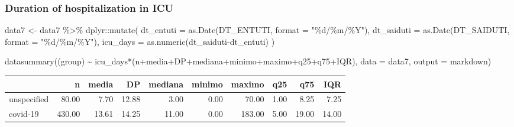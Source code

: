 \documentclass[
]{article}
\newenvironment{Shaded}{\begin{snugshade}}{\end{snugshade}}
\newcommand{\AttributeTok}[1]{\textcolor[rgb]{0.77,0.63,0.00}{#1}}
\newcommand{\FunctionTok}[1]{\textcolor[rgb]{0.00,0.00,0.00}{#1}}
\newcommand{\NormalTok}[1]{#1}
\newcommand{\OtherTok}[1]{\textcolor[rgb]{0.56,0.35,0.01}{#1}}
\newcommand{\SpecialCharTok}[1]{\textcolor[rgb]{0.00,0.00,0.00}{#1}}
\newcommand{\StringTok}[1]{\textcolor[rgb]{0.31,0.60,0.02}{#1}}
\begin{document}
\hypertarget{duration-of-hospitalization-in-icu}{%
\subsubsection{Duration of hospitalization in
ICU}\label{duration-of-hospitalization-in-icu}}

\begin{Shaded}
\begin{Highlighting}[]
\NormalTok{data7 }\OtherTok{\textless{}{-}}\NormalTok{ data7 }\SpecialCharTok{\%\textgreater{}\%}
\NormalTok{   dplyr}\SpecialCharTok{::}\FunctionTok{mutate}\NormalTok{(}
    \AttributeTok{dt\_entuti =} \FunctionTok{as.Date}\NormalTok{(DT\_ENTUTI, }\AttributeTok{format =} \StringTok{"\%d/\%m/\%Y"}\NormalTok{),}
    \AttributeTok{dt\_saiduti =} \FunctionTok{as.Date}\NormalTok{(DT\_SAIDUTI, }\AttributeTok{format =} \StringTok{"\%d/\%m/\%Y"}\NormalTok{),}
    \AttributeTok{icu\_days =} \FunctionTok{as.numeric}\NormalTok{(dt\_saiduti}\SpecialCharTok{{-}}\NormalTok{dt\_entuti)}
\NormalTok{)}
\end{Highlighting}
\end{Shaded}

\begin{Shaded}
\begin{Highlighting}[]
\FunctionTok{datasummary}\NormalTok{((group) }\SpecialCharTok{\textasciitilde{}}\NormalTok{ icu\_days}\SpecialCharTok{*}\NormalTok{(n}\SpecialCharTok{+}\NormalTok{media}\SpecialCharTok{+}\NormalTok{DP}\SpecialCharTok{+}\NormalTok{mediana}\SpecialCharTok{+}\NormalTok{minimo}\SpecialCharTok{+}\NormalTok{maximo}\SpecialCharTok{+}\NormalTok{q25}\SpecialCharTok{+}\NormalTok{q75}\SpecialCharTok{+}\NormalTok{IQR),}
            \AttributeTok{data =}\NormalTok{ data7, }\AttributeTok{output =} \StringTok{\textquotesingle{}markdown\textquotesingle{}}\NormalTok{)}
\end{Highlighting}
\end{Shaded}

\begin{longtable}[]{@{}lrrrrrrrrr@{}}
\toprule
& n & media & DP & mediana & minimo & maximo & q25 & q75 & IQR \\
\midrule
\endhead
unspecified & 80.00 & 7.70 & 12.88 & 3.00 & 0.00 & 70.00 & 1.00 & 8.25 &
7.25 \\
covid-19 & 430.00 & 13.61 & 14.25 & 11.00 & 0.00 & 183.00 & 5.00 & 19.00
& 14.00 \\
\bottomrule
\end{longtable}
\end{document}
